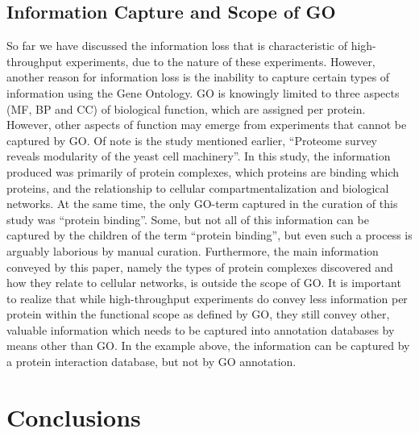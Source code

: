 \documentclass[12pt]{article}
\begin{document}
\subsection*{Information Capture and Scope of GO}

So far we have discussed the information loss that is characteristic of high-throughput
experiments, due to the nature of these experiments. However, another reason for information loss
is the inability to capture certain types of information using the Gene Ontology. GO is knowingly
limited to three aspects (MF, BP and CC) of biological function, which are assigned per protein.
However, other aspects of function may emerge from experiments that cannot be captured by GO.  Of
note is the study mentioned earlier, ``Proteome survey reveals modularity of the yeast cell
machinery''\cite{18029348}.  In this study, the information produced was primarily of protein
complexes, which proteins are binding which proteins, and the relationship to cellular
compartmentalization and biological networks. At the same time, the only GO-term captured in the
curation of this study was ``protein binding''.  Some, but not all of this information can be
captured by the children of the term ``protein binding'', but even such a process is arguably
laborious by manual curation. Furthermore, the main information conveyed by this paper, namely the
types of protein complexes discovered and how they relate to cellular networks, is outside the
scope of GO. It is important to realize that while high-throughput experiments do convey less
information per protein within the functional scope as defined by GO, they still convey other,
valuable information which needs to be captured into annotation databases by means other than GO.
In the example above, the information can be captured by a protein interaction database, but not
by GO annotation.

\section*{Conclusions}
\end{document}
